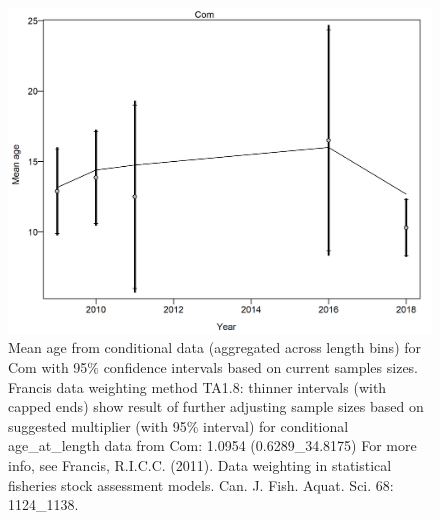 \documentclass[12pt,]{article}
\begin{document}
\begin{figure}
\centering
\includegraphics{./r4ss/plots_mod1/comp_condAALfit_data_weighting_TA1.8_condAgeCom.png}
\caption{Mean age from conditional data (aggregated across length bins)
for Com with 95\% confidence intervals based on current samples sizes.
Francis data weighting method TA1.8: thinner intervals (with capped
ends) show result of further adjusting sample sizes based on suggested
multiplier (with 95\% interval) for conditional age\_at\_length data
from Com: 1.0954 (0.6289\_34.8175) For more info, see Francis, R.I.C.C.
(2011). Data weighting in statistical fisheries stock assessment models.
Can. J. Fish. Aquat. Sci. 68: 1124\_1138.
\label{fig:mod1_5_comp_condAALfit_data_weighting_TA1.8_condAgeCom}}
\end{figure}
\end{document}
